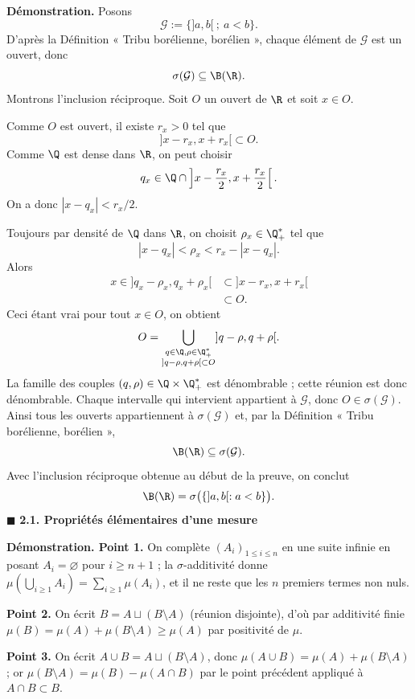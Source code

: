 
\textbf{Démonstration.} Posons
\[\mathcal G:=\{]a,b[\ ;\ a<b\}.\]
D’après la Définition « Tribu borélienne, borélien », chaque élément de $\mathcal G$ est un ouvert, donc
\[\sigma(\mathcal G)\subseteq\B(\R).\]
Montrons l’inclusion réciproque. Soit $O$ un ouvert de $\R$ et soit $x\in O$.

Comme $O$ est ouvert, il existe $r_x>0$ tel que
\[]x-r_x,x+r_x[\subset O.\]
Comme $\Q$ est dense dans $\R$, on peut choisir
\[q_x\in\Q\cap\left]x-\frac{r_x}2,x+\frac{r_x}2\right[.\]
On a donc $|x-q_x|<r_x/2$.

Toujours par densité de $\Q$ dans $\R$, on choisit $\rho_x\in\Q_+^*$ tel que
\[|x-q_x|<\rho_x<r_x-|x-q_x|.\]
Alors
\[
\begin{aligned}
x\in]q_x-\rho_x,q_x+\rho_x[&\subset]x-r_x,x+r_x[\\
&\subset O.
\end{aligned}
\]
Ceci étant vrai pour tout $x\in O$, on obtient
\[O=\bigcup_{\substack{q\in\Q,\rho\in\Q_+^*\\]q-\rho,q+\rho[\subset O}}]q-\rho,q+\rho[.\]
La famille des couples $(q,\rho)\in\Q\times\Q_+^*$ est dénombrable ; cette réunion est donc dénombrable. Chaque intervalle qui intervient appartient à $\mathcal G$, donc $O\in\sigma(\mathcal G)$. Ainsi tous les ouverts appartiennent à $\sigma(\mathcal G)$ et, par la Définition « Tribu borélienne, borélien »,
\[\B(\R)\subseteq\sigma(\mathcal G).\]
Avec l’inclusion réciproque obtenue au début de la preuve, on conclut
\[\B(\R)=\sigma\bigl(\{]a,b[:a<b\}\bigr).\]
\hfill$\blacksquare$
\textbf{2.1. Propriétés élémentaires d’une mesure}


\textbf{Démonstration. Point 1.} On complète $(A_i)_{1\le i\le n}$ en une suite infinie en posant $A_i=\varnothing$ pour $i\ge n+1$ ; la $\sigma$-additivité donne $\mu(\bigcup_{i\ge1}A_i)=\sum_{i\ge1}\mu(A_i)$, et il ne reste que les $n$ premiers termes non nuls.

\textbf{Point 2.} On écrit $B=A\sqcup(B\setminus A)$ (réunion disjointe), d’où par additivité finie $\mu(B)=\mu(A)+\mu(B\setminus A)\ge\mu(A)$ par positivité de $\mu$.

\textbf{Point 3.} On écrit $A\cup B=A\sqcup(B\setminus A)$, donc $\mu(A\cup B)=\mu(A)+\mu(B\setminus A)$ ; or $\mu(B\setminus A)=\mu(B)-\mu(A\cap B)$ par le point précédent appliqué à $A\cap B\subset B$.

